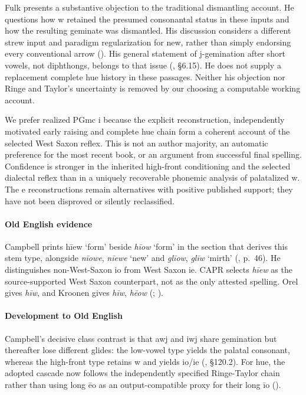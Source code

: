 \documentclass[
  british,
  a4paper,
]{article}
\begin{document}
Fulk presents a substantive objection to the traditional dismantling
account. He questions how w retained the presumed consonantal status in
these inputs and how the resulting geminate was dismantled. His
discussion considers a different strew input and paradigm regularization
for new, rather than simply endorsing every conventional arrow
(). His general statement of
j-gemination after short vowels, not diphthongs, belongs to that issue
(, §6.15). He does not supply a
replacement complete hue history in these passages. Neither his
objection nor Ringe and Taylor's uncertainty is removed by our choosing
a computable working account.

We prefer realized PGmc i because the explicit reconstruction,
independently motivated early raising and complete hue chain form a
coherent account of the selected West Saxon reflex. This is not an
author majority, an automatic preference for the most recent book, or an
argument from successful final spelling. Confidence is stronger in the
inherited high-front conditioning and the selected dialectal reflex than
in a uniquely recoverable phonemic analysis of palatalized w. The e
reconstructions remain alternatives with positive published support;
they have not been disproved or silently reclassified.

\paragraph{Old English evidence}\label{old-english-evidence-77}

Campbell prints {hīew} `form' beside \emph{hīow} `form' in the section
that derives this stem type, alongside \emph{nīowe}, \emph{nīewe} `new'
and \emph{glīow}, \emph{glīw} `mirth'
(, p.~46). He
distinguishes non-West-Saxon io from West Saxon ie. CAPR selects
\emph{hīew} as the source-supported West Saxon counterpart, not as the
only attested spelling. Orel gives \emph{hīw}, and Kroonen gives
\emph{hīw}, \emph{hēow} (;
).

\paragraph{Development to Old
English}\label{development-to-old-english-77}

Campbell's decisive class contrast is that awj and iwj share gemination
but thereafter lose different glides: the low-vowel type yields the
palatal consonant, whereas the high-front type retains w and yields
io/ie (, §120.2). For hue,
the adopted cascade now follows the independently specified Ringe-Taylor
chain rather than using long ēo as an output-compatible proxy for their
long īo ().
\end{document}
